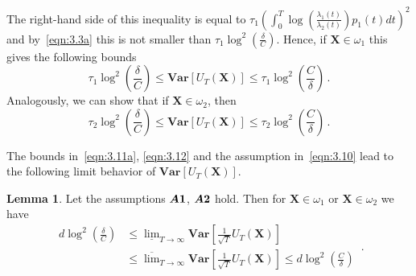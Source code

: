 \documentclass[lettersize,journal,onecolumn]{IEEEtran}
\theoremstyle{definition}
\newtheorem{lemma}{Lemma}
\newcommand{\Var}[1]{\mathbf{Var}\left[#1\right]}
\newcommand{\assumption}[1]{{\rm \boldsymbol{A#1}}}
\begin{document}
The right-hand side of this inequality is equal to \mbox{$
	\tau_{1}\left(
	\int_{0}^{T}
	\log\left(\frac{\lambda_{1}(t)}{\lambda_{2}(t)}\right)
	p_{1}(t)dt
	\right)^{2}
	$} and by~\eqref{eqn:3.3a} this is not smaller than \mbox{$
	\tau_{1}\log^{2}\left(\frac{\delta}{C}\right)
	$}. Hence, if $\mathbf{X}\in\omega_{1}$ this gives the following bounds
\begin{equation}
	\tau_{1}\log^{2}\left(\frac{\delta}{C}\right) \leq
	\Var{U_{T}(\mathbf{X})} \leq
	\tau_{1}\log^{2}\left(\frac{C}{\delta}\right)
	\label{eqn:3.11a}\,.
\end{equation}
Analogously, we can show that if $\mathbf{X}\in\omega_{2}$, then
\begin{equation}
	\tau_{2}\log^{2}\left(\frac{\delta}{C}\right) \leq
	\Var{U_{T}(\mathbf{X})} \leq
	\tau_{2}\log^{2}\left(\frac{C}{\delta}\right)
	\label{eqn:3.12}\,.
\end{equation}

The bounds in~\eqref{eqn:3.11a}, \eqref{eqn:3.12} and the assumption
in~\eqref{eqn:3.10} lead to the following limit behavior of
$\Var{U_{T}(\mathbf{X})}$.
\begin{lemma}
	\label{lemma:4}
	Let the assumptions $\assumption{1}$, $\assumption{2}$ hold. Then for
	$\mathbf{X}\in\omega_{1}$ or $\mathbf{X}\in\omega_{2}$ we have
	\begin{equation}
		\begin{split}
			d\log^{2}\left(\frac{\delta}{C}\right) 
			& \leq
			\underline{\lim}_{T\to\infty}
			\Var{\frac{1}{\sqrt{T}}U_{T}\left(\mathbf{X}\right)} \\
			& \leq
			\overline{\lim}_{T\to\infty}
			\Var{\frac{1}{\sqrt{T}}U_{T}\left(\mathbf{X}\right)} \leq
			d\log^{2}\left(\frac{C}{\delta}\right)
		\end{split}
		\label{eqn:3.12b} \,.
	\end{equation}
\end{lemma}
\end{document}
